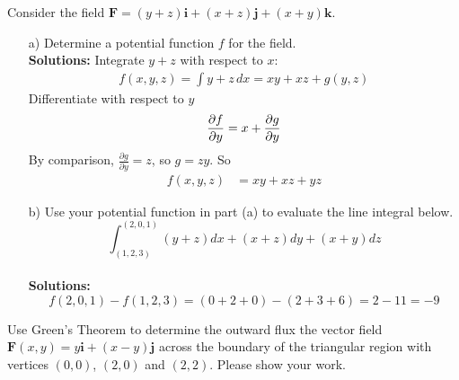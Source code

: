 % 
\ifnum {}
    \question[4]{} Consider the field $\mathbf F = (y+z)\mathbf i + (x+z)\mathbf j + (x+y)\mathbf k$. 
    \begin{enumerate}
        \item[a)] Determine a potential function $f$ for the field. 
        \ifnum {} {\color{DarkBlue} \\[12pt] 
        \textbf{Solutions:} 
        Integrate $y+z$ with respect to $x$:
        \begin{align}
            f(x,y,z) = \int y+z \, dx = xy+xz + g(y,z)
        \end{align}
        Differentiate with respect to $y$
        \begin{align}
            \frac{\partial f}{\partial y} = x+\frac{\partial g}{\partial y}
        \end{align}
        By comparison, $\frac{\partial g}{\partial y} = z$, so $g = zy$. So
        \begin{align}
            f(x,y,z) &= xy + xz + yz
        \end{align}
        } 
        \else 
        \vspace{4cm}
        \fi
        \item[b)] Use your potential function in part (a) to evaluate the line integral below. 
        $$\int_{(1,2,3)}^{(2,0,1)}(y+z) dx + (x+z) dy + (x+y) dz$$
        \ifnum {} {\color{DarkBlue} \\[12pt] 
        \textbf{Solutions:}
        $$ f(2,0,1) - f(1,2,3) =  (0+2+0) - (2+3+6) = 2 - 11 = -9$$
        } 
        \else 
        \newpage
        \fi
    \end{enumerate}
    
\fi
    
% 
\ifnum {}
    \question[4]{}
    Use Green's Theorem to determine the outward flux the vector field $\mathbf F(x,y) = y \mathbf i + (x-y)\mathbf j$ across the boundary of the triangular region  with vertices $(0,0)$, $(2,0)$ and $(2,2)$. Please show your work. 
    
    

